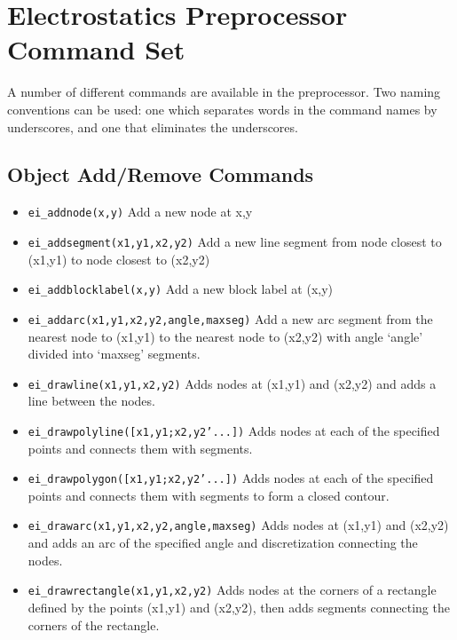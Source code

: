 \section{Electrostatics Preprocessor Command Set}

A number of different commands are available in the preprocessor.
Two naming conventions can be used: one which separates words in
the command names by underscores, and one that eliminates the
underscores.

\subsection{Object Add/Remove Commands}
\begin{itemize}
\item {\tt ei\_addnode(x,y)} Add a new node at x,y

\item {\tt ei\_addsegment(x1,y1,x2,y2)} Add a new line segment from node closest to
(x1,y1) to node closest to (x2,y2)

\item {\tt ei\_addblocklabel(x,y)} Add a new block label at (x,y)

\item {\tt ei\_addarc(x1,y1,x2,y2,angle,maxseg)} Add a new arc segment from the
nearest node to (x1,y1) to the nearest node to (x2,y2) with angle `angle'
divided into `maxseg' segments.

\item{\tt ei\_drawline(x1,y1,x2,y2)} Adds nodes at (x1,y1) and
(x2,y2) and adds a line between the nodes.

\item{\tt ei\_drawpolyline([x1,y1;x2,y2'...])} Adds nodes at each
of the specified points and connects them with segments.

\item{\tt ei\_drawpolygon([x1,y1;x2,y2'...])} Adds nodes at each
of the specified points and connects them with segments to form a
closed contour.

\item{\tt ei\_drawarc(x1,y1,x2,y2,angle,maxseg)} Adds nodes at
(x1,y1) and (x2,y2) and adds an arc of the specified angle and
discretization connecting the nodes.

\item{\tt ei\_drawrectangle(x1,y1,x2,y2)} Adds nodes at the
corners of a rectangle defined by the points (x1,y1) and (x2,y2),
then adds segments connecting the corners of the rectangle.


\end{itemize}
